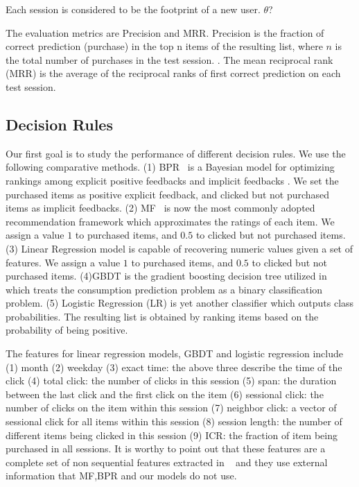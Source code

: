 \documentclass[sigconf]{acmart}
\begin{document}
Each session is considered to be the footprint of a new user. $\theta$?
  
The evaluation metrics are Precision and MRR. Precision is the fraction of correct prediction (purchase) in the top n items of the resulting list, where $n$ is the total number of purchases in the test session. . The mean reciprocal rank (MRR) is the average of the reciprocal ranks of first correct prediction on each test session.

\subsection{Decision Rules}


Our first goal is to study the performance of different decision rules. We use the following comparative methods. (1) BPR~\cite{Rendle2009} is a Bayesian model for optimizing rankings among explicit positive feedbacks and implicit feedbacks . We set the purchased items as positive explicit feedback, and clicked but not purchased items as implicit feedbacks. (2) MF~\cite{Koren2009Matrix} is now the most commonly adopted recommendation framework which approximates the ratings of each item. We assign a value $1$ to purchased items, and $0.5$ to clicked but not purchased items. (3) Linear Regression model is capable of recovering numeric values given a set of features. We assign a value $1$ to purchased items, and $0.5$ to clicked but not purchased items. (4)GBDT is the  gradient boosting decision tree utilized in~\cite{Yan2015E} which treats the consumption prediction problem as a binary classification problem. (5) Logistic Regression (LR) is yet another classifier which outputs class probabilities. The resulting list is obtained by ranking items based on the probability of being positive. 

The features for linear regression models, GBDT and logistic regression include (1) month (2) weekday (3) exact time: the above three describe the time of the click (4) total click: the number of clicks in this session (5) span: the duration between the last click and the first click on the item (6) sessional click: the number of clicks on the item within this session (7) neighbor click: a vector of sessional click for all items within this session (8) session length: the number of different items being clicked in this session (9) ICR: the fraction of item being purchased in all sessions. It is worthy to point out that these features are a complete set of non sequential features extracted in ~\cite{Yan2015E} and they use external information that MF,BPR and our models do not use.
\end{document}
